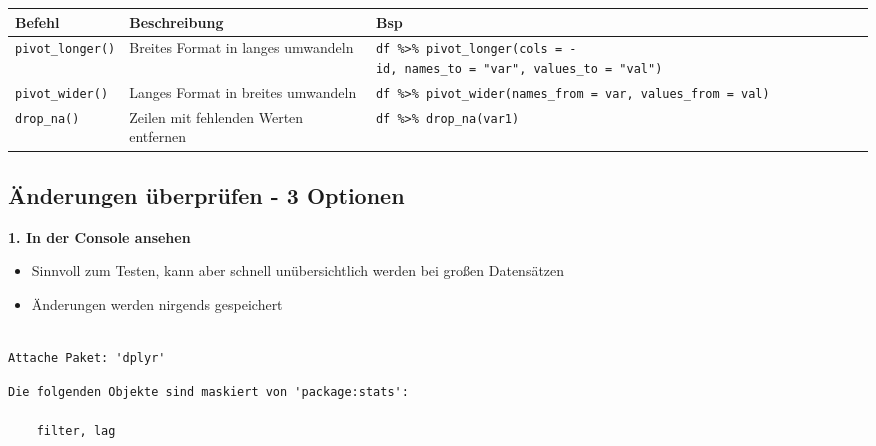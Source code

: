 \documentclass[
  custompaper,
  DIV=11,
  numbers=noendperiod]{scrartcl}
\begin{document}
\begin{longtable}[]{@{}
  >{\raggedright\arraybackslash}p{}
  >{\raggedright\arraybackslash}p{}
  >{\raggedright\arraybackslash}p{}@{}}
\toprule\noalign{}
\begin{minipage}[b]{\linewidth}\raggedright
Befehl
\end{minipage} & \begin{minipage}[b]{\linewidth}\raggedright
Beschreibung
\end{minipage} & \begin{minipage}[b]{\linewidth}\raggedright
Bsp
\end{minipage} \\
\midrule\noalign{}
\endhead
\bottomrule\noalign{}
\endlastfoot
\texttt{pivot\_longer()} & Breites Format in langes umwandeln &
\texttt{df\ \%\textgreater{}\%\ pivot\_longer(cols\ =\ -id,\ names\_to\ =\ "var",\ values\_to\ =\ "val")} \\
\texttt{pivot\_wider()} & Langes Format in breites umwandeln &
\texttt{df\ \%\textgreater{}\%\ pivot\_wider(names\_from\ =\ var,\ values\_from\ =\ val)} \\
\texttt{drop\_na()} & Zeilen mit fehlenden Werten entfernen &
\texttt{df\ \%\textgreater{}\%\ drop\_na(var1)} \\
\end{longtable}

\subsection{Änderungen überprüfen - 3
Optionen}\label{uxe4nderungen-uxfcberpruxfcfen---3-optionen}

\textbf{1. In der Console ansehen}

\begin{itemize}
\item
  Sinnvoll zum Testen, kann aber schnell unübersichtlich werden bei
  großen Datensätzen
\item
  Änderungen werden nirgends gespeichert
\end{itemize}

\begin{verbatim}

Attache Paket: 'dplyr'
\end{verbatim}

\begin{verbatim}
Die folgenden Objekte sind maskiert von 'package:stats':

    filter, lag
\end{verbatim}
\end{document}
